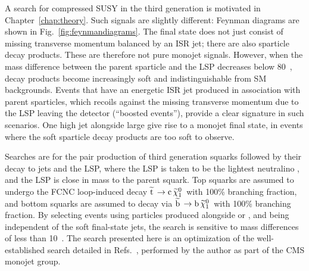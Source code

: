 A search for compressed \ac{SUSY} in the third generation is motivated in Chapter~\ref{chap:theory}.
Such signals are slightly different: Feynman diagrams are shown in Fig.~\ref{fig:feynmandiagrams}. 
The final state does not just consist of missing transverse momentum balanced by an ISR jet; 
there are also sparticle decay products.
These are therefore not pure monojet signals.
However, when the mass difference between the parent sparticle and the \ac{LSP} decreases below 80~\GeV, decay products become increasingly soft
and indistinguishable from \ac{SM} backgrounds.
Events that have an energetic \ac{ISR} jet produced in association with parent sparticles, which recoils against the missing transverse momentum due to the LSP leaving the detector (``boosted events''),
provide a clear signature in such scenarios.
One high \pt jet alongside large \MET give rise to a monojet final state, in events where the soft sparticle decay products are too soft to observe.


Searches are for the pair production of 
third generation squarks followed by their decay to jets and the LSP, where the LSP is taken to be the lightest neutralino \chiOneZero, 
and the LSP is close in mass to the parent squark.
Top squarks \sTop are assumed to undergo the \ac{FCNC} loop-induced decay $\widetilde{{\rm t}}\, \rightarrow {\rm c}\, \widetilde{\chi}^{0}_{1}\,$ with 100\% branching fraction, and
bottom squarks \sBot are assumed to decay via 
$\widetilde{{\rm b}}\, \rightarrow {\rm b}\, \widetilde{\chi}^{0}_{1}\,$ with 100\% branching fraction.
By selecting events using particles produced alongside \sTop\santiTop or \sBot\santiBot, and being independent of the soft final-state jets, the search is sensitive to mass differences of less than 10~\GeV.
The search presented here is an optimization of the well-established search detailed in Refs.~\cite{bib:CMSEXO12048,bib:CMS_EXO11003,bib:CMSEXO11059}, performed by the author as part of the CMS monojet group.


